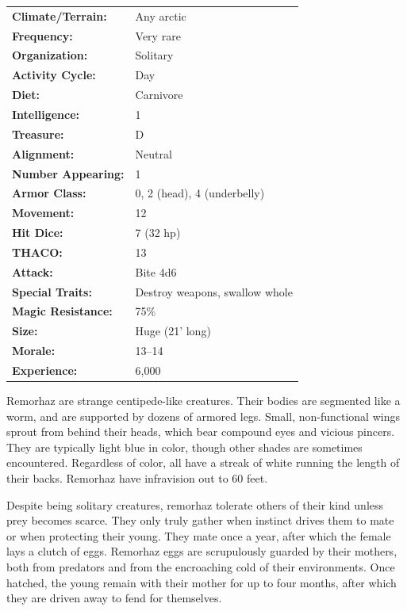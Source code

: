 \begin{multicols}{2}
\begin{minipage}{\columnwidth}
\noindent \begin{tabular}{p{}p{}}
\textbf{Climate/Terrain:}	& Any arctic	\\
\textbf{Frequency:} 		& Very rare	\\
\textbf{Organization:} 		& Solitary	\\
\textbf{Activity Cycle:} 	& Day	\\
\textbf{Diet:} 				& Carnivore	\\
\textbf{Intelligence:} 		& 1	\\
\textbf{Treasure:} 			& D	\\
\textbf{Alignment:} 		& Neutral	\\
\hline
\textbf{Number Appearing:} 	& 1	\\
\textbf{Armor Class:} 		& 0, 2 (head), 4 (underbelly)	\\
\textbf{Movement:} 			& 12	\\
\textbf{Hit Dice:} 			& 7 (32 hp)	\\
\textbf{THACO:} 			& 13	\\
\textbf{Attack:} 			& Bite 4d6	\\
\textbf{Special Traits:} & Destroy weapons, swallow whole	\\
\textbf{Magic Resistance:} 	& 75\%	\\
\textbf{Size:} 				& Huge (21' long)	\\
\textbf{Morale:} 			& 13--14	\\
\textbf{Experience:} 		& 6,000	\\ %
\end{tabular}

\end{minipage}

Remorhaz are strange centipede-like creatures. Their bodies are segmented like a worm, and are supported by dozens of armored legs. Small, non-functional wings sprout from behind their heads, which bear compound eyes and vicious pincers. They are typically light blue in color, though other shades are sometimes encountered. Regardless of color, all have a streak of white running the length of their backs. Remorhaz have infravision out to 60 feet.

Despite being solitary creatures, remorhaz tolerate others of their kind unless prey becomes scarce. They only truly gather when instinct drives them to mate or when protecting their young. They mate once a year, after which the female lays a clutch of eggs. Remorhaz eggs are scrupulously guarded by their mothers, both from predators and from the encroaching cold of their environments. Once hatched, the young remain with their mother for up to four months, after which they are driven away to fend for themselves.


\end{multicols}
